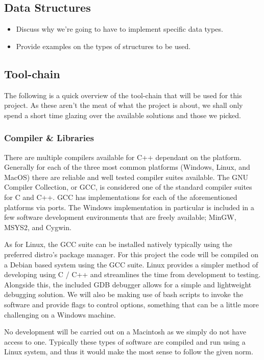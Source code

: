 \documentclass{article}
\begin{document}
\subsection{Data Structures}
\begin{itemize}
    \item Discuss why we're going to have to implement specific data types.
    \item Provide examples on the types of structures to be used.
\end{itemize}

\subsection{Tool-chain}
The following is a quick overview of the tool-chain that will be used for this project. As these aren't the meat of what the project is about, we shall only spend a short time glazing over the available solutions and those we picked.

\subsubsection{Compiler \& Libraries}
There are multiple compilers available for C++ dependant on the platform. Generally for each of the three most common platforms (Windows, Linux, and MacOS) there are reliable and well tested compiler suites available. The GNU Compiler Collection, or GCC, is considered one of the standard compiler suites for C and C++. GCC has implementations for each of the aforementioned platforms via ports. The Windows implementation in particular is included in a few software development environments that are freely available; MinGW, MSYS2, and Cygwin.

As for Linux, the GCC suite can be installed natively typically using the preferred distro's package manager. For this project the code will be compiled on a Debian based system using the GCC suite. Linux provides a simpler method of developing using C / C++ and streamlines the time from development to testing. Alongside this, the included GDB debugger allows for a simple and lightweight debugging solution. We will also be making use of bash scripts to invoke the software and provide flags to control options, something that can be a little more challenging on a Windows machine.

No development will be carried out on a Macintosh as we simply do not have access to one. Typically these types of software are compiled and run using a Linux system, and thus it would make the most sense to follow the given norm.
\end{document}
